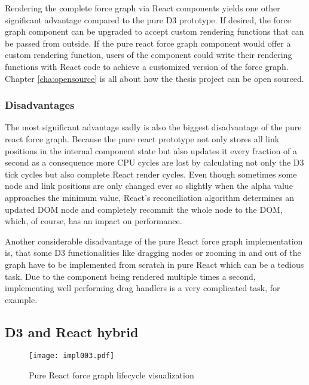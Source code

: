 Rendering the complete force graph via React components yields one other significant advantage compared to the pure D3 prototype. If desired, the force graph component can be upgraded to accept custom rendering functions that can be passed from outside. If the pure react force graph component would offer a custom rendering function, users of the component could write their rendering functions with React code to achieve a customized version of the force graph. Chapter \ref{cha:opensource} is all about how the thesis project can be open sourced.

\subsubsection{Disadvantages}

The most significant advantage sadly is also the biggest disadvantage of the pure react force graph. Because the pure react prototype not only stores all link positions in the internal component state but also updates it every fraction of a second as a consequence more CPU cycles are lost by calculating not only the D3 tick cycles but also complete React render cycles. Even though sometimes some node and link positions are only changed ever so slightly when the alpha value approaches the minimum value, React's reconciliation algorithm determines an updated DOM node and completely recommit the whole node to the DOM, which, of course, has an impact on performance.

Another considerable disadvantage of the pure React force graph implementation is, that some D3 functionalities like dragging nodes or zooming in and out of the graph have to be implemented from scratch in pure React which can be a tedious task. Due to the component being rendered multiple times a second, implementing well performing drag handlers is a very complicated task, for example.


\subsection{D3 and React hybrid}
\label{sub:D3AndReactHybrid}

\begin{figure}
\centering
\texttt{[image: impl003.pdf]}
\caption{Pure React force graph lifecycle visualization}
\label{fig:reactD3HybridLifeCycle}
\end{figure}

